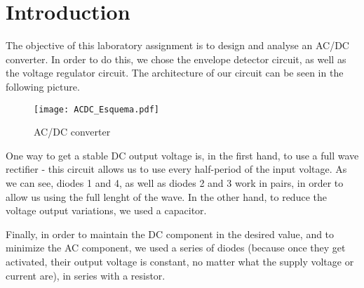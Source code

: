 \section{Introduction}
\label{sec:introduction}

\par The objective of this laboratory assignment is to design and analyse an AC/DC converter. In order to do this, we chose the envelope detector circuit, as well as the voltage regulator circuit. The architecture of our circuit can be seen in the following picture.

\begin{figure}[H] \centering
\texttt{[image: ACDC\_Esquema.pdf]}
\caption{AC/DC converter}
\label{fig:AC/DC_Scheme}
\end{figure}

\par One way to get a stable DC output voltage is, in the first hand, to use a full wave rectifier - this circuit allows us to use every half-period of the input voltage. As we can see, diodes 1 and 4, as well as diodes 2 and 3 work in pairs, in order to allow us using the full lenght of the wave. In the other hand, to reduce the voltage output variations, we used a capacitor.
\par Finally, in order to maintain the DC component in the desired value, and to minimize the AC component, we used a series of diodes (because once they get activated, their output voltage is constant, no matter what the supply voltage or current are), in series with a resistor.

\newpage
